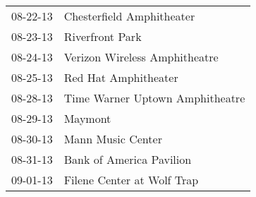 \begin{supertabular}{p{0.07\textwidth}p{0.23\textwidth}}
 08-22-13 &        Chesterfield Amphitheater \\
 08-23-13 &                  Riverfront Park \\
 08-24-13 &    Verizon Wireless Amphitheatre \\
 08-25-13 &             Red Hat Amphitheater \\
 08-28-13 &  Time Warner Uptown Amphitheatre \\
 08-29-13 &                          Maymont \\
 08-30-13 &                Mann Music Center \\
 08-31-13 &         Bank of America Pavilion \\
 09-01-13 &       Filene Center at Wolf Trap \\
\end{supertabular}
